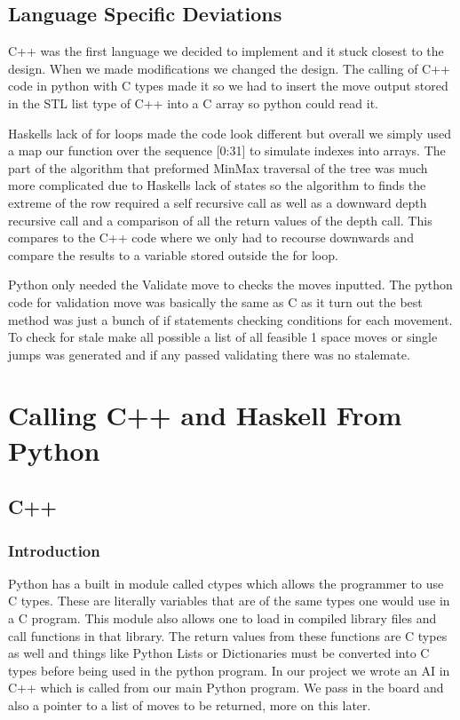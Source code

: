\documentclass[12pt]{article}
\begin{document}
	\subsection{Language Specific Deviations}
C++ was the first language we decided to implement and it stuck closest to the design. When we made modifications we changed the design. The calling of C++ code in python with C types made it so we had to insert the move output stored in the STL list type of C++ into a C array so python could read it.
\par
Haskells lack of for loops made the code look different but overall we simply used a map our function over the sequence [0:31] to simulate indexes into arrays. The part of the algorithm that preformed MinMax traversal of the tree was much more complicated due to Haskells lack of states so the algorithm to finds the extreme of the row required a self recursive call as well as a downward depth recursive call and a comparison of all the return values of the depth call. This compares to the C++ code where we only had to recourse downwards and compare the results to a variable stored outside the for loop.
\par
Python only needed the Validate move to checks the moves inputted. The python code for validation move was basically the same as C as it turn out the best method was just a bunch of if statements checking conditions for each movement. To check for stale make all possible a list of all feasible 1 space moves or single jumps was generated and if any passed validating there was no stalemate.

\section{Calling C++ and Haskell From Python}
    \subsection{C++}
        \subsubsection{Introduction}
            Python has a built in module called ctypes which allows the programmer
            to use C types. These are literally variables that are of the same types
            one would use in a C program. This module also allows one to load in compiled
            library files and call functions in that library. The return values from these
            functions are C types as well and things like Python Lists or Dictionaries must
            be converted into C types before being used in the python program. In our project
            we wrote an AI in C++ which is called from our main Python program. We pass in
            the board and also a pointer to a list of moves to be returned, more on this
            later.
\end{document}

